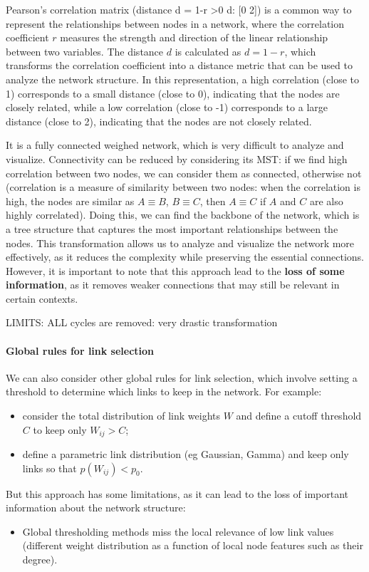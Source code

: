 \begin{example}
    Pearson’s correlation matrix (distance d = 1-r >0 d: [0 2]) is a common way to represent the relationships between nodes in a network, where the correlation coefficient \(r\) measures the strength and direction of the linear relationship between two variables. The distance \(d\) is calculated as \(d = 1 - r\), which transforms the correlation coefficient into a distance metric that can be used to analyze the network structure. In this representation, a high correlation (close to 1) corresponds to a small distance (close to 0), indicating that the nodes are closely related, while a low correlation (close to -1) corresponds to a large distance (close to 2), indicating that the nodes are not closely related.

    It is a fully connected weighed network, which is very difficult to analyze and visualize. Connectivity can be reduced by considering its MST: if we find high correlation between two nodes, we can consider them as connected, otherwise not (correlation is a measure of similarity between two nodes: when the correlation is high, the nodes are similar as \(A \equiv B\), \(B \equiv C\), then \(A \equiv C\) if \(A\) and \(C\) are also highly correlated).
    Doing this, we can find the backbone of the network, which is a tree structure that captures the most important relationships between the nodes. This transformation allows us to analyze and visualize the network more effectively, as it reduces the complexity while preserving the essential connections. However, it is important to note that this approach lead to the \textbf{loss of some information}, as it removes weaker connections that may still be relevant in certain contexts.

    LIMITS:
    ALL cycles are removed: very drastic transformation
\end{example}

\paragraph{Global rules for link selection}
We can also consider other global rules for link selection, which involve setting a threshold to determine which links to keep in the network. For example:
\begin{itemize}
    \item consider the total distribution of link weights \(W\) and define a cutoff threshold \(C\) to keep only \(W_{ij} > C\);
    \item define a parametric link distribution (eg Gaussian, Gamma) and keep only links so that \(p(W_{ij}) < p_0\).
\end{itemize}
But this approach has some limitations, as it can lead to the loss of important information about the network structure:
\begin{itemize}
    \item Global thresholding methods miss the local relevance of low link values (different weight distribution as a function of local node features such as their degree).
\end{itemize}

